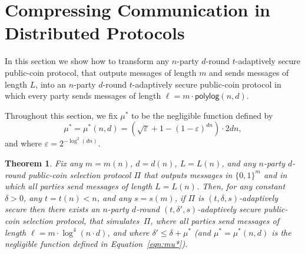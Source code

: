 \documentclass[11pt]{article}
\theoremstyle{plain}
\newtheorem{theorem}{Theorem}[section]
\theoremstyle{definition}
\numberwithin{equation}{section}
\numberwithin{equation}{section} \newcommand{\aka} {also known as\ }
\def\epsilon{\varepsilon}
\newcommand{\1}{\mathbf{1}}
\newcommand{\polylog}{{\mathsf{polylog}}}
\theoremstyle{remark}
\begin{document}
\section{Compressing Communication in Distributed Protocols}\label{sec:proof}
In this section we show how to transform any $n$-party $d$-round $t$-adaptively secure
public-coin protocol, that outputs messages of length $m$ and sends messages of
length $L$, into an $n$-party $d$-round $t$-adaptively secure
public-coin protocol in which every party sends messages of length $\ell =
m\cdot\polylog(n,d)$.

Throughout this section, we fix $\mu^*$ to be the negligible function defined by
\begin{equation}\label{eqn:mu*}
  \mu^*=\mu^*(n,d)=\left(\sqrt{\epsilon}+1-(1-\epsilon)^{dn}\right)\cdot 2dn,
\end{equation}
  and where $\epsilon=2^{-\log^2(dn)}$.

\begin{theorem}\label{thm:main}
Fix any $m=m(n)$, $d=d(n)$, $L=L(n)$, and any $n$-party $d$-round public-coin
  selection protocol $\Pi$ that outputs messages in $\{0,1\}^m$ and in which all parties send
  messages of length $L=L(n)$.  Then, for any constant $\delta>0$, any $t=t(n)<n$, and any $s=s(m)$, if $\Pi$ is $(t,\delta,s)$-adaptively secure then there exists an $n$-party $d$-round
  $(t,\delta',s)$-adaptively secure public-coin selection protocol, that simulates~$\Pi$, where all parties send messages of length $\ell =
  m\cdot\log^4(n\cdot d)$, and where $\delta'\leq\delta+\mu^*$ (and $\mu^*=
\mu^*(n,d)$ is the negligible function defined in Equation~\eqref{eqn:mu*}).
\end{theorem}
\end{document}
